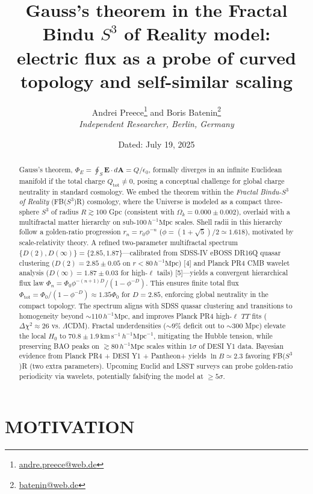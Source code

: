 \documentclass[10pt,twocolumn]{article}
\title{Gauss's theorem in the Fractal Bindu $S^3$ of Reality model:\\
electric flux as a probe of curved topology and self-similar scaling}
\author{Andrei Preece\thanks{\href{mailto:andre.preece@web.de}{andre.preece@web.de}} and Boris Batenin\thanks{\href{mailto:batenin@web.de}{batenin@web.de}}\\
\textit{Independent Researcher, Berlin, Germany}}
\date{Dated: July 19, 2025}
\begin{document}
\maketitle

\begin{abstract}
Gauss's theorem, $\Phi_E = \oint_S \mathbf{E}\cdot d\mathbf{A} = Q/\epsilon_0$, formally diverges in an infinite Euclidean manifold if the total charge $Q_{\mathrm{tot}} \ne 0$, posing a conceptual challenge for global charge neutrality in standard cosmology. We embed the theorem within the \textit{Fractal Bindu-$S^3$ of Reality} (FB($S^3$)R) cosmology, where the Universe is modeled as a compact three-sphere $S^3$ of radius $R \gtrsim 100$ Gpc (consistent with $\Omega_k = 0.000 \pm 0.002$), overlaid with a multifractal matter hierarchy on sub-$100\,h^{-1}\mathrm{Mpc}$ scales. Shell radii in this hierarchy follow a golden-ratio progression $r_n = r_0\phi^{-n}$ ($\phi = (1 + \sqrt{5})/2 \simeq 1.618$), motivated by scale-relativity theory. A refined two-parameter multifractal spectrum $\{D(2),D(\infty)\}=\{2.85,1.87\}$---calibrated from SDSS-IV eBOSS DR16Q quasar clustering ($D(2)=2.85\pm0.05$ on $r<80\,h^{-1}\mathrm{Mpc}$) [4] and Planck PR4 CMB wavelet analysis ($D(\infty)=1.87\pm0.03$ for high-$\ell$ tails) [5]---yields a convergent hierarchical flux law $\Phi_n = \Phi_0\phi^{-(n+1)D}/(1-\phi^{-D})$. This ensures finite total flux $\Phi_{\mathrm{tot}}=\Phi_0/(1-\phi^{-D})\approx1.35\Phi_0$ for $D=2.85$, enforcing global neutrality in the compact topology. The spectrum aligns with SDSS quasar clustering and transitions to homogeneity beyond $\sim110\,h^{-1}\mathrm{Mpc}$, and improves Planck PR4 high-$\ell$ $TT$ fits ($\Delta\chi^2\approx26$ vs. $\Lambda$CDM). Fractal underdensities ($\sim9\%$ deficit out to $\sim300$ Mpc) elevate the local $H_0$ to $70.8\pm1.9\,\mathrm{km}\,\mathrm{s}^{-1}\,h^{-1}\mathrm{Mpc}^{-1}$, mitigating the Hubble tension, while preserving BAO peaks on $\gtrsim80\,h^{-1}\mathrm{Mpc}$ scales within $1\sigma$ of DESI Y1 data. Bayesian evidence from Planck PR4 + DESI Y1 + Pantheon+ yields $\ln B\simeq2.3$ favoring FB($S^3$)R (two extra parameters). Upcoming Euclid and LSST surveys can probe golden-ratio periodicity via wavelets, potentially falsifying the model at $\ge5\sigma$.
\end{abstract}

\section{MOTIVATION}
\end{document}
